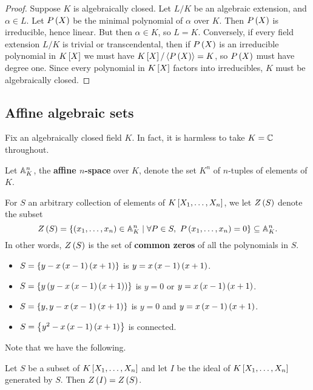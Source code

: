 \begin{proof}
Suppose $ K $ is algebraically closed. Let $ L / K $ be an algebraic extension, and $ \alpha \in L $. Let $ P\rb{X} $ be the minimal polynomial of $ \alpha $ over $ K $. Then $ P\rb{X} $ is irreducible, hence linear. But then $ \alpha \in K $, so $ L = K $. Conversely, if every field extension $ L / K $ is trivial or transcendental, then if $ P\rb{X} $ is an irreducible polynomial in $ K\sb{X} $ we must have $ K\sb{X} / \ab{P\rb{X}} = K $, so $ P\rb{X} $ must have degree one. Since every polynomial in $ K\sb{X} $ factors into irreducibles, $ K $ must be algebraically closed.
\end{proof}

\subsection{Affine algebraic sets}

Fix an algebraically closed field $ K $. In fact, it is harmless to take $ K = \C $ throughout.

\begin{definition}
Let $ \A_K^n $, the \textbf{affine $ n $-space} over $ K $, denote the set $ K^n $ of $ n $-tuples of elements of $ K $.
\end{definition}

For $ S $ an arbitrary collection of elements of $ K\sb{X_1, \dots, X_n} $, we let $ Z\rb{S} $ denote the subset
$$ Z\rb{S} = \cb{\rb{x_1, \dots, x_n} \in \A_K^n \mid \forall P \in S, \ P\rb{x_1, \dots, x_n} = 0} \subseteq \A_K^n. $$
In other words, $ Z\rb{S} $ is the set of \textbf{common zeros} of all the polynomials in $ S $.

\begin{example2}
\hfill
\begin{itemize}
\item $ S = \cb{y - x\rb{x - 1}\rb{x + 1}} $ is $ y = x\rb{x - 1}\rb{x + 1} $.
\item $ S = \cb{y\rb{y - x\rb{x - 1}\rb{x + 1}}} $ is $ y = 0 $ or $ y = x\rb{x - 1}\rb{x + 1} $.
\item $ S = \cb{y, y - x\rb{x - 1}\rb{x + 1}} $ is $ y = 0 $ and $ y = x\rb{x - 1}\rb{x + 1} $.
\item $ S = \cb{y^2 - x\rb{x - 1}\rb{x + 1}} $ is connected.
\end{itemize}
\end{example2}

Note that we have the following.

\begin{lemma}
Let $ S $ be a subset of $ K\sb{X_1, \dots, X_n} $ and let $ I $ be the ideal of $ K\sb{X_1, \dots, X_n} $ generated by $ S $. Then $ Z\rb{I} = Z\rb{S} $.
\end{lemma}

